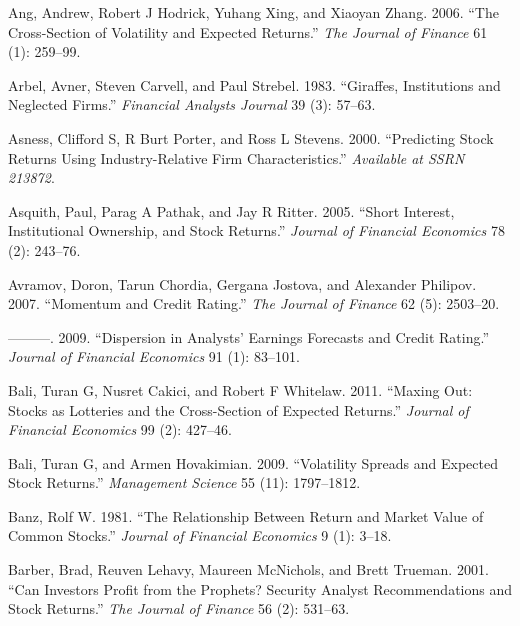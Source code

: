 \documentclass[
  letterpaper,
  DIV=11,
  numbers=noendperiod]{scrreprt}
\newlength{\cslhangindent}
\newlength{\cslentryspacingunit} %
\newenvironment{CSLReferences}[2] %
 {%
  \setlength{\parindent}{0pt}
  \ifodd #1
  \let\oldpar\par
  \def\par{\hangindent=\cslhangindent\oldpar}
  \fi
  \setlength{\parskip}{#2\cslentryspacingunit}
 }%
 {}
\begin{document}
\begin{CSLReferences}{1}{0}
\leavevmode{}%
Ang, Andrew, Robert J Hodrick, Yuhang Xing, and Xiaoyan Zhang. 2006.
{``The Cross-Section of Volatility and Expected Returns.''} \emph{The
Journal of Finance} 61 (1): 259--99.

\leavevmode{}%
Arbel, Avner, Steven Carvell, and Paul Strebel. 1983. {``Giraffes,
Institutions and Neglected Firms.''} \emph{Financial Analysts Journal}
39 (3): 57--63.

\leavevmode{}%
Asness, Clifford S, R Burt Porter, and Ross L Stevens. 2000.
{``Predicting Stock Returns Using Industry-Relative Firm
Characteristics.''} \emph{Available at SSRN 213872}.

\leavevmode{}%
Asquith, Paul, Parag A Pathak, and Jay R Ritter. 2005. {``Short
Interest, Institutional Ownership, and Stock Returns.''} \emph{Journal
of Financial Economics} 78 (2): 243--76.

\leavevmode{}%
Avramov, Doron, Tarun Chordia, Gergana Jostova, and Alexander Philipov.
2007. {``Momentum and Credit Rating.''} \emph{The Journal of Finance} 62
(5): 2503--20.

\leavevmode{}%
---------. 2009. {``Dispersion in Analysts' Earnings Forecasts and
Credit Rating.''} \emph{Journal of Financial Economics} 91 (1): 83--101.

\leavevmode{}%
Bali, Turan G, Nusret Cakici, and Robert F Whitelaw. 2011. {``Maxing
Out: Stocks as Lotteries and the Cross-Section of Expected Returns.''}
\emph{Journal of Financial Economics} 99 (2): 427--46.

\leavevmode{}%
Bali, Turan G, and Armen Hovakimian. 2009. {``Volatility Spreads and
Expected Stock Returns.''} \emph{Management Science} 55 (11):
1797--1812.

\leavevmode{}%
Banz, Rolf W. 1981. {``The Relationship Between Return and Market Value
of Common Stocks.''} \emph{Journal of Financial Economics} 9 (1): 3--18.

\leavevmode{}%
Barber, Brad, Reuven Lehavy, Maureen McNichols, and Brett Trueman. 2001.
{``Can Investors Profit from the Prophets? Security Analyst
Recommendations and Stock Returns.''} \emph{The Journal of Finance} 56
(2): 531--63.


\end{CSLReferences}
\end{document}
